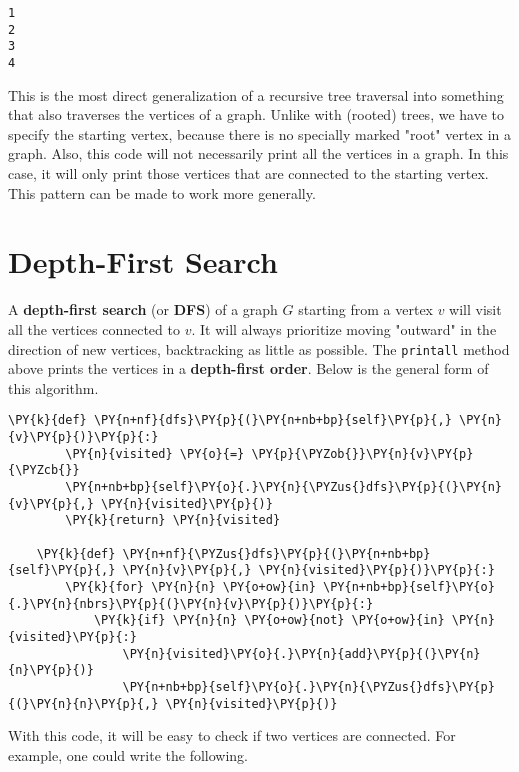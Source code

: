 \begin{Verbatim}
1
2
3
4
\end{Verbatim}


This is the most direct generalization of a recursive tree traversal into something that also traverses the vertices of a graph.
Unlike with (rooted) trees, we have to specify the starting vertex, because there is no specially marked "root" vertex in a graph.
Also, this code will not necessarily print all the vertices in a graph.
In this case, it will only print those vertices that are connected to the starting vertex.
This pattern can be made to work more generally.

\section{Depth-First Search}


A \textbf{depth-first search} (or \textbf{DFS}) of a graph $G$ starting from a vertex $v$ will visit all the vertices connected to $v$.
It will always prioritize moving "outward" in the direction of new vertices, backtracking as little as possible.
The \texttt{printall} method above prints the vertices in a \textbf{depth-first order}.
Below is the general form of this algorithm.

\begin{Verbatim}[commandchars=\\\{\}]
    \PY{k}{def} \PY{n+nf}{dfs}\PY{p}{(}\PY{n+nb+bp}{self}\PY{p}{,} \PY{n}{v}\PY{p}{)}\PY{p}{:}
        \PY{n}{visited} \PY{o}{=} \PY{p}{\PYZob{}}\PY{n}{v}\PY{p}{\PYZcb{}}
        \PY{n+nb+bp}{self}\PY{o}{.}\PY{n}{\PYZus{}dfs}\PY{p}{(}\PY{n}{v}\PY{p}{,} \PY{n}{visited}\PY{p}{)}
        \PY{k}{return} \PY{n}{visited}

    \PY{k}{def} \PY{n+nf}{\PYZus{}dfs}\PY{p}{(}\PY{n+nb+bp}{self}\PY{p}{,} \PY{n}{v}\PY{p}{,} \PY{n}{visited}\PY{p}{)}\PY{p}{:}
        \PY{k}{for} \PY{n}{n} \PY{o+ow}{in} \PY{n+nb+bp}{self}\PY{o}{.}\PY{n}{nbrs}\PY{p}{(}\PY{n}{v}\PY{p}{)}\PY{p}{:}
            \PY{k}{if} \PY{n}{n} \PY{o+ow}{not} \PY{o+ow}{in} \PY{n}{visited}\PY{p}{:}
                \PY{n}{visited}\PY{o}{.}\PY{n}{add}\PY{p}{(}\PY{n}{n}\PY{p}{)}
                \PY{n+nb+bp}{self}\PY{o}{.}\PY{n}{\PYZus{}dfs}\PY{p}{(}\PY{n}{n}\PY{p}{,} \PY{n}{visited}\PY{p}{)}
\end{Verbatim}



With this code, it will be easy to check if two vertices are connected.
For example, one could write the following.

